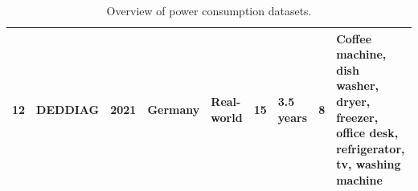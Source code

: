 \begin{table}
{\begin{tabular}{lllp{}lp{}lp{}p{}}
            12          & DEDDIAG          & 2021          & Germany           & Real-world    & 15                 & 3.5 years       & 8                      & Coffee machine, dish washer, dryer, freezer, office desk, refrigerator, tv, washing machine                                                                                                                                                                                                                                                                                                                                                                   \\ \hline
        \end{tabular}}
    \caption{Overview of power consumption datasets.}
    \label{tab:datasets_overview}
\end{table}

